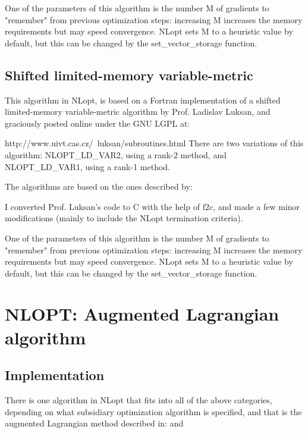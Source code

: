 One of the parameters of this algorithm is the number M of gradients to "remember" from previous optimization steps: increasing M increases the memory requirements but may speed convergence. NLopt sets M to a heuristic value by default, but this can be changed by the set\_vector\_storage function. 





\subsection{Shifted limited-memory variable-metric}
This algorithm in NLopt, is based on a Fortran implementation of a shifted limited-memory variable-metric algorithm by Prof. Ladislav Luksan, and graciously posted online under the GNU LGPL at: 

http://www.uivt.cas.cz/~luksan/subroutines.html 
There are two variations of this algorithm: NLOPT\_LD\_VAR2, using a rank-2 method, and NLOPT\_LD\_VAR1, using a rank-1 method. 

The algorithms are based on the ones described by: \cite{Vlcek_2006}



I converted Prof. Luksan's code to C with the help of f2c, and made a few minor modifications (mainly to include the NLopt termination criteria). 

One of the parameters of this algorithm is the number M of gradients to "remember" from previous optimization steps: increasing M increases the memory requirements but may speed convergence. NLopt sets M to a heuristic value by default, but this can be changed by the set\_vector\_storage function. 




\section{NLOPT: Augmented Lagrangian algorithm}
\label{AugmentedLagrangian}

\subsection{Implementation}
There is one algorithm in NLopt that fits into all of the above categories, depending on what subsidiary optimization algorithm is specified, and that is the augmented Lagrangian method described in: \cite{Conn_1991} and \cite{Birgin_2008}



